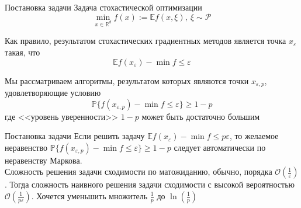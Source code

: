 \documentclass{beamer}
\newcommand{\E}{\mathbb{E}}
\newcommand{\e}{\varepsilon}
\begin{document}

 \begin{frame}{Постановка задачи}
Задача стохастической оптимизации \[\min_{x \in \mathbb{R}^d} f(x) := \E{f(x, \xi)}, \ \xi \sim \mathcal{P}\]

Как правило, результатом стохастических градиентных методов является точка $x_{\e}$ такая, что 
\[\E{f(x_{\e})} - \min f \le \e\]

Мы рассматриваем алгоритмы, результатом которых являются точки $x_{\e, p}$, удовлетворяющие условию
\[\mathds{P} \{f(x_{\e, p})-\min f \le \e\} \ge 1 - p\]
где <<уровень уверенности>> $1 - p$ может быть достаточно большим


\end{frame}
 \begin{frame}{Постановка задачи}
Если решить задачу $\E{f(x_{\e})} - \min f \le p\e$, то желаемое неравенство $\mathds{P} \{f(x_{\e, p})-\min f \le \e\} \ge 1 - p$ следует автоматически по неравенству Маркова. 
\\
Сложность решения задачи сходимости по матожиданию, обычно, порядка $\mathcal{O} (\frac{1}{\e})$. Тогда сложность наивного решения задачи сходимости с высокой вероятностью $\mathcal{O} (\frac{1}{p\e})$. Хочется уменьшить множитель $\frac{1}{p}$ до $\ln(\frac{1}{p})$


\end{frame}
\end{document}
